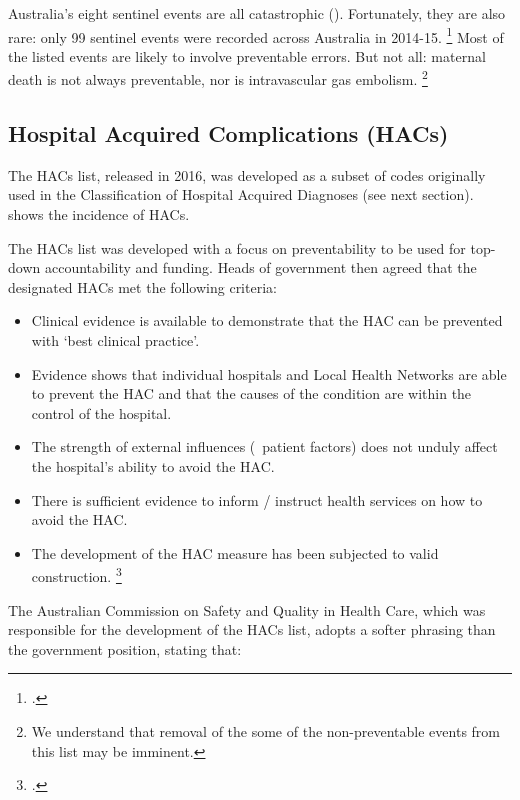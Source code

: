 \documentclass[FrontPage]{grattan}
\begin{document}
Australia's eight sentinel events are all catastrophic ().
Fortunately, they are also rare: only 99 sentinel events were recorded across Australia in 2014-15.%
	\footcite{PC-2017-Report-on-Govt-services--Public-hospitals}
	Most of the listed events are likely to involve preventable errors.
But not all: maternal death is not always preventable, nor is intravascular gas embolism.%
	\footnote{We understand that removal of the some of the non-preventable events from this list may be imminent.}

\subsection{Hospital Acquired Complications (HACs)}\label{subsec:hospital-acquired-complications-hacs}

The HACs list, released in 2016, was developed as a subset of codes originally used in the Classification of Hospital Acquired Diagnoses (see next section).  shows the incidence of HACs.

The HACs list was developed with a focus on preventability to be used for top-down accountability and funding.
Heads of government then agreed that the designated HACs met the following criteria:

\begin{itemize}
\item
  Clinical evidence is available to demonstrate that the HAC can be prevented with `best clinical practice'.
\item
  Evidence shows that individual hospitals and Local Health Networks are able to prevent the HAC and that the causes of the condition are within the control of the hospital.
\item
  The strength of external influences (\eg~patient factors) does not unduly affect the hospital's ability to avoid the HAC.
\item
  There is sufficient evidence to inform / instruct health services on how to avoid the HAC.
\item
  The development of the HAC measure has been subjected to valid construction.%
	\footcite{COAG-2017-ScheduleI-Revised-public-hospital-arrangements}
\end{itemize}

The Australian Commission on Safety and Quality in Health Care, which was responsible for the development of the HACs list, adopts a softer phrasing than the government position, stating that:
\end{document}
